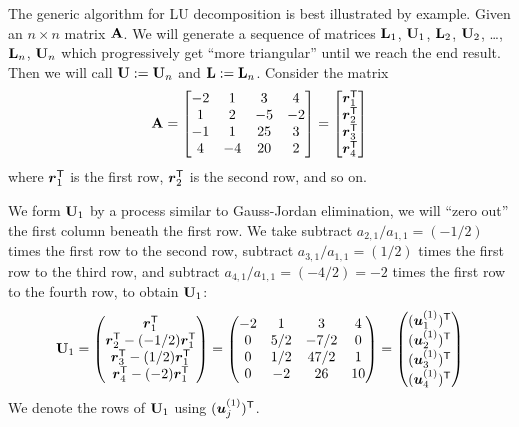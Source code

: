 The generic algorithm for LU decomposition is best illustrated by
example. Given an $n\times n$ matrix $\mathbf{A}$.
We will generate a sequence of matrices $\mathbf{L}_{1}$,
$\mathbf{U}_{1}$, $\mathbf{L}_{2}$, $\mathbf{U}_{2}$, \dots, $\mathbf{L}_{n}$,
$\mathbf{U}_{n}$ which progressively get ``more triangular'' until we reach
the end result. Then we will call $\mathbf{U}:=\mathbf{U}_{n}$ and
$\mathbf{L}:=\mathbf{L}_{n}$. Consider the matrix
\begin{equation}
  \mathbf{A} =
  \begin{bmatrix}
    -2 &  1 & 3  &  4 \\
     1 &  2 & -5 & -2 \\
    -1 &  1 & 25 &  3 \\
     4 & -4 & 20 &  2 
  \end{bmatrix} = \begin{bmatrix}\boldsymbol{r}_{1}^{\mathsf{T}}\\
    \boldsymbol{r}_{2}^{\mathsf{T}}\\
    \boldsymbol{r}_{3}^{\mathsf{T}}\\
    \boldsymbol{r}_{4}^{\mathsf{T}}
  \end{bmatrix}
\end{equation}
where $\boldsymbol{r}_{1}^{\mathsf{T}}$ is the first row,
$\boldsymbol{r}_{2}^{\mathsf{T}}$ is the second row, and so on.

We form $\mathbf{U}_{1}$ by a process similar to Gauss-Jordan elimination,
we will ``zero out'' the first column beneath the first row.
We take subtract $a_{2,1}/a_{1,1}=(-1/2)$ times the first row to the second row, 
subtract $a_{3,1}/a_{1,1}=(1/2)$ times the first row to the third row,
and subtract $a_{4,1}/a_{1,1}=(-4/2)=-2$ times the first row to the fourth
row, to obtain $\mathbf{U}_{1}$:
\begin{equation}
\mathbf{U}_{1} = \begin{pmatrix}\boldsymbol{r}_{1}^{\mathsf{T}}\\
  \boldsymbol{r}_{2}^{\mathsf{T}} - (-1/2)\boldsymbol{r}_{1}^{\mathsf{T}}\\
  \boldsymbol{r}_{3}^{\mathsf{T}} - (1/2)\boldsymbol{r}_{1}^{\mathsf{T}}\\
  \boldsymbol{r}_{4}^{\mathsf{T}} - (-2)\boldsymbol{r}_{1}^{\mathsf{T}}
\end{pmatrix} = \begin{pmatrix}
    -2 &  1  & 3    &  4 \\
     0 & 5/2 & -7/2 &  0\\
     0 & 1/2 & 47/2 &  1\\
     0 &  -2 &   26 & 10
\end{pmatrix} = \begin{pmatrix}(\boldsymbol{u}^{(1)}_{1})^{\mathsf{T}}\\
  (\boldsymbol{u}^{(1)}_{2})^{\mathsf{T}}\\
  (\boldsymbol{u}^{(1)}_{3})^{\mathsf{T}}\\
  (\boldsymbol{u}^{(1)}_{4})^{\mathsf{T}}
\end{pmatrix}
\end{equation}
We denote the rows of $\mathbf{U}_{1}$ using $(\boldsymbol{u}^{(1)}_{j})^{\mathsf{T}}$.

